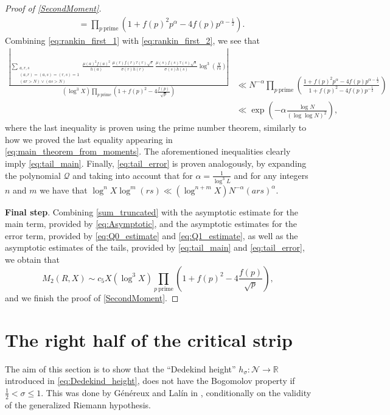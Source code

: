 \documentclass[10pt,a4paper]{amsart}
\theoremstyle{plain}
\theoremstyle{definition}
\theoremstyle{remark}
\begin{document}
\begin{proof}[Proof of \cref{SecondMoment}]
\begin{equation}
\begin{aligned}
&= \prod_{p \ \text{prime}}\left(1+f(p)^2p^{\alpha}-4f(p)p^{\alpha-\frac{1}{2}}\right).
    \end{aligned}
\end{equation}
Combining \eqref{eq:rankin_first_1} with \eqref{eq:rankin_first_2}, we see that
\begin{align*}
\frac{\displaystyle{\left\lvert \sum_{\substack{a,r,s \\
(a,r)=(a,s)=(r,s)=1 \\ (ar > N) \vee (as > N)}}
\frac{\mu(a)^2f(a)^2}{h(a)} \, \frac{\mu(r)f(r)\tau(r)\sqrt{r}}{\sigma(r)h(r)} \, \frac{\mu(s)f(s)\tau(s)\sqrt{s}}{\sigma(s)h(s)} \log^3\left(\frac{X}{rs}\right) \right\rvert}}{\displaystyle{(\log^3 X)\prod_{p \ \text{prime}}\left(1+f(p)^2-4\frac{f(p)}{\sqrt{p}}\right)}}
&\ll N^{-\alpha} \prod_{p \ \text{prime}} \left( \frac{1+f(p)^2p^{\alpha}-4f(p)p^{\alpha-\frac{1}{2}}}{1+f(p)^2-4 f(p) p^{-\frac{1}{2}}} \right)\\
&\ll \exp\left(-\alpha\frac{\log N}{(\log\log N)^2}\right),
\end{align*}
where the last inequality is proven using the prime number theorem, similarly to how we proved the last equality appearing in \eqref{eq:main_theorem_from_moments}. The aforementioned inequalities clearly imply \eqref{eq:tail_main}. 
Finally, \eqref{eq:tail_error} is proven analogously, by expanding the polynomial $\mathcal{Q}$ and taking into account that for $\alpha=\frac{1}{\log^3L}$ and for any integers $n$ and $m$ we have that $\log^nX\log^m(rs)\ll (\log^{n+m}X)N^{-\alpha}(ars)^{\alpha}$.

\textbf{Final step}. Combining \eqref{sum_truncated} with the asymptotic estimate for the main term, provided by \eqref{eq:Asymptotic}, and the asymptotic estimates for the error term, provided by \eqref{eq:Q0_estimate} and \eqref{eq:Q1_estimate}, as well as the asymptotic estimates of the tails, provided by \eqref{eq:tail_main} and \eqref{eq:tail_error}, we obtain that
\[
M_2(R,X)\sim c_5 X(\log^3 X)\prod_{p \ \text{prime}}\left(1+f(p)^2-4\frac{f(p)}{\sqrt{p}}\right),
\]
and we finish the proof of \cref{SecondMoment}.
\end{proof}



\section{The right half of the critical strip}\label{sec:cricialright}

The aim of this section is to show that the ``Dedekind height'' $h_\sigma \colon \mathcal{N} \to \mathbb{R}$ introduced in \eqref{eq:Dedekind_height}, does not have the Bogomolov property if $\frac{1}{2} < \sigma \leq 1$. This was done by Généreux and Lalín in \cite{GeLa24}, conditionally on the validity of the generalized Riemann hypothesis. 
\end{document}
